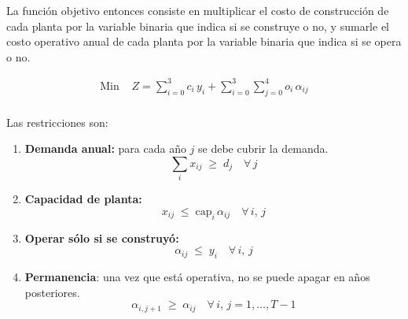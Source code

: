 \documentclass[12pt]{article}
\begin{document}
La función objetivo entonces consiste en multiplicar el costo de construcción de cada planta por la variable binaria que indica si se construye o no, y sumarle el costo operativo anual de cada planta por la variable binaria que indica si se opera o no.

\begin{align*}
    \text{Min } & Z = \sum_{i=0}^{3} c_i\,y_i + \sum_{i=0}^{3}\sum_{j=0}^{4} o_i\,\alpha_{ij} \\
\end{align*}

Las restricciones son:

\begin{enumerate}[label=(R\arabic*)]
    \item \textbf{Demanda anual:} para cada año $j$ se debe cubrir la demanda.
          \[\sum_{i} x_{ij} \;\ge\; d_j \quad \forall\, j\]
    \item \textbf{Capacidad de planta:}
          \[x_{ij} \;\le\; \text{cap}_i\,\alpha_{ij} \quad \forall\, i,\,j\]
    \item \textbf{Operar sólo si se construyó:}
          \[\alpha_{ij} \;\le\; y_i \quad \forall\, i,\,j\]
    \item \textbf{Permanencia}: una vez que está operativa, no se puede apagar en años posteriores.
          \[\alpha_{i,j+1} \;\ge\; \alpha_{ij} \quad \forall\, i,\,j=1,\dots,T-1\]
\end{enumerate}
\end{document}
